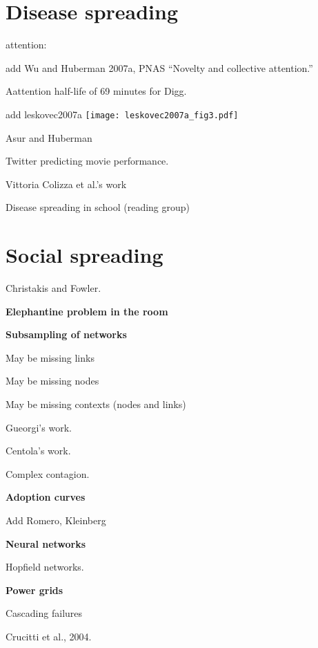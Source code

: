 \section{Disease spreading}

attention:

add Wu and Huberman 2007a, PNAS
``Novelty and collective attention.''

Aattention half-life of 69 minutes for Digg.

add leskovec2007a
\texttt{[image: leskovec2007a\_fig3.pdf]}

Asur and Huberman

Twitter predicting movie performance.

  

  Vittoria Colizza et al.'s work



  

  Disease spreading in school (reading group)




\section{Social spreading}

  

  Christakis and Fowler.


  \textbf{Elephantine problem in the room}

  \textbf{Subsampling of networks}
    
     
      May be missing links
     
      May be missing nodes
     
      May be missing contexts (nodes and links)
     
      Gueorgi's work.
    
  




  

  Centola's work.

  Complex contagion.


  \textbf{Adoption curves}

  Add Romero, Kleinberg


  \textbf{Neural networks}

  Hopfield networks.



  \textbf{Power grids}

  Cascading failures

  Crucitti et al., 2004.

